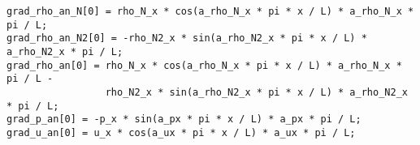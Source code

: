 \documentclass[10pt]{article}
\begin{document}
\begin{verbatim}
grad_rho_an_N[0] = rho_N_x * cos(a_rho_N_x * pi * x / L) * a_rho_N_x * pi / L;
grad_rho_an_N2[0] = -rho_N2_x * sin(a_rho_N2_x * pi * x / L) * a_rho_N2_x * pi / L;
grad_rho_an[0] = rho_N_x * cos(a_rho_N_x * pi * x / L) * a_rho_N_x * pi / L -
                 rho_N2_x * sin(a_rho_N2_x * pi * x / L) * a_rho_N2_x * pi / L;
grad_p_an[0] = -p_x * sin(a_px * pi * x / L) * a_px * pi / L;
grad_u_an[0] = u_x * cos(a_ux * pi * x / L) * a_ux * pi / L;
\end{verbatim}



%
 

\end{document}
